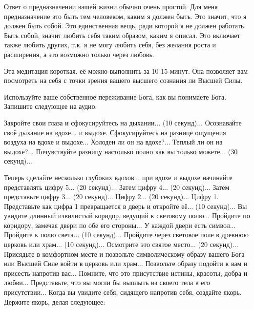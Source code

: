 \documentclass[10pt, fleqn]{article}
\begin{document}
Ответ о предназначении вашей жизни обычно очень простой. Для меня предназначение это быть тем человеком, каким я должен быть. Это значит, что я должен быть собой. Это единственная вещь, ради которой я не должен работать. Быть собой, значит любить себя таким образом, каким я описал. Это включает также любить других, т.к. я не могу любить себя, без желания роста и расширения, а это возможно только через любовь.


Эта медитация короткая. её можно выполнить за 10-15 минут. Она позволяет вам посмотреть на себя с точки зрения вашего высшего сознания ли Высшей Силы.

Используйте ваше собственное переживание Бога, как вы понимаете Бога. Запишите следующее на аудио:

Закройте свои глаза и сфокусируйтесь на дыхании... (10 секунд)... Осознавайте своё дыхание на вдохе... и выдохе. Сфокусируйтесь на разнице ощущения воздуха на вдохе и выдохе... Холоден ли он на вдохе?... Теплый ли он на выдохе?... Почувствуйте разницу настолько полно как вы только можете... (30 секунд)...

Теперь сделайте несколько глубоких вдохов... при вдохе и выдохе начинайте представлять цифру 5... (20 секунд)... Затем цифру 4... (20 секунд)... Затем представьте цифру 3... (20 секунд)... Цифру 2... (20 секунд)... Цифру 1. Представьте как цифра 1 превращается в дверь и откройте её... (10 секунд)... Вы увидите длинный извилистый коридор, ведущий к световому полю... Пройдите по коридору, замечая двери по обе его стороны... У каждой двери есть символ... Пройдите к полю света... (10 секунд)... Пройдите через световое поле в древнюю церковь или храм... (10 секунд)... Осмотрите это святое место... (20 секунд)... Присядьте в комфортном месте и позвольте символическому образу вашего Бога или Высшей Силе войти в церковь или храм... Позвольте образу подойти к вам и присесть напротив вас... Помните, что это присутствие истины, красоты, добра и любви... Представьте, что вы могли бы выплыть из своего тела в его присутствии... Когда вы увидите себя, сидящего напротив себя, создайте якорь. Держите якорь, делая следующее:
\end{document}
